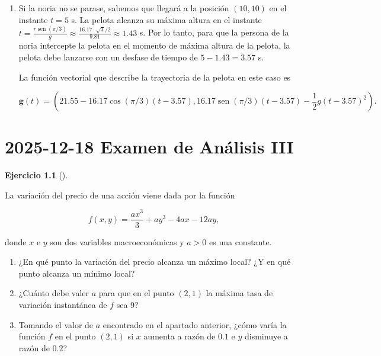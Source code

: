 \documentclass[
  spanish,
  a4paper,
]{scrreport}
\theoremstyle{definition}
\newtheorem{exercise}{Ejercicio}[chapter]
\theoremstyle{remark}
\begin{document}
\begin{tcolorbox}
\begin{enumerate}
  De la segunda ecuación obtenemos
  \(r^2 = \frac{10}{0.0382} \approx 261.6\), por lo que
  \(r \approx 16.17\) m/s. Sustituyendo este valor en la primera
  ecuación, obtenemos \(x_0 - 0.0441 \cdot 261.78 = 10\), es decir,
  \(x_0 \approx 21.55\) m. Por lo tanto, la pelota debe lanzarse desde
  una distancia de aproximadamente \(21.55\) m del origen con una
  rapidez de aproximadamente \(16.17\) m/s para que la persona de la
  noria intercepte la pelota en el momento de máxima altura de la
  pelota.
\item
  Si la noria no se parase, sabemos que llegará a la posición
  \((10,10)\) en el instante \(t=5\) s. La pelota alcanza su máxima
  altura en el instante
  \(t = \frac{r\operatorname{sen}(\pi/3)}{g} \approx \frac{16.17 \cdot \sqrt{3}/2}{9.81} \approx 1.43\)
  s. Por lo tanto, para que la persona de la noria intercepte la pelota
  en el momento de máxima altura de la pelota, la pelota debe lanzarse
  con un desfase de tiempo de \(5 - 1.43 = 3.57\) s.

  La función vectorial que describe la trayectoria de la pelota en este
  caso es

  \[ 
  \mathbf{g}(t) = (21.55 - 16.17\cos(\pi/3)(t - 3.57), 16.17\operatorname{sen}(\pi/3)(t - 3.57) - \frac{1}{2}g(t - 3.57)^2).
  \]
\end{enumerate}

\end{tcolorbox}


\chapter{\texorpdfstring{2025-12-18 Examen de Análisis
III}{2025-12-18  Examen de Análisis III}}\label{examen-de-anuxe1lisis-iii-5}

\begin{exercise}[]\protect\hypertarget{exr-1}{}\label{exr-1}

La variación del precio de una acción viene dada por la función

\[
f(x,y)=\dfrac{ax^3}{3} + ay^3-4ax-12ay,
\]

donde \(x\) e \(y\) son dos variables macroeconómicas y \(a>0\) es una
constante.

\begin{enumerate}
\def\labelenumi{\alph{enumi}.}
\item
  ¿En qué punto la variación del precio alcanza un máximo local? ¿Y en
  qué punto alcanza un mínimo local?
\item
  ¿Cuánto debe valer \(a\) para que en el punto \((2,1)\) la máxima tasa
  de variación instantánea de \(f\) sea \(9\)?
\item
  Tomando el valor de \(a\) encontrado en el apartado anterior, ¿cómo
  varía la función \(f\) en el punto \((2,1)\) si \(x\) aumenta a razón
  de \(0.1\) e \(y\) disminuye a razón de \(0.2\)?
\end{enumerate}

\end{exercise}
\end{document}

